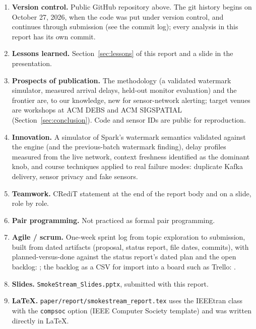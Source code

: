 \begin{enumerate}
\item \textbf{Version control.} Public GitHub repository above. The git history begins on October 27, 2026, when the code was put under version control, and continues through submission (see the commit log); every analysis in this report has its own commit.

\item \textbf{Lessons learned.} Section~\ref{sec:lessons} of this report and a slide in the presentation.

\item \textbf{Prospects of publication.} The methodology (a validated watermark simulator, measured arrival delays, held-out monitor evaluation) and the frontier are, to our knowledge, new for sensor-network alerting; target venues are workshops at ACM DEBS and ACM SIGSPATIAL (Section~\ref{sec:conclusion}). Code and sensor IDs are public for reproduction.

\item \textbf{Innovation.} A simulator of Spark's watermark semantics validated against the engine (and the previous-batch watermark finding), delay profiles measured from the live network, context freshness identified as the dominant knob, and course techniques applied to real failure modes: duplicate Kafka delivery, sensor privacy and fake sensors.

\item \textbf{Teamwork.} CRediT statement at the end of the report body and on a slide, role by role.

\item \textbf{Pair programming.} Not practiced as formal pair programming.

\item \textbf{Agile / scrum.} One-week sprint log from topic exploration to submission, built from dated artifacts (proposal, status report, file dates, commits), with planned-versus-done against the status report's dated plan and the open backlog: ; the backlog as a CSV for import into a board such as Trello: .

\item \textbf{Slides.} \texttt{SmokeStream\_Slides.pptx}, submitted with this report.

\item \textbf{LaTeX.} \texttt{paper/report/smokestream\_report.tex} uses the IEEEtran class with the \texttt{compsoc} option (IEEE Computer Society template) and was written directly in LaTeX.


\end{enumerate}
